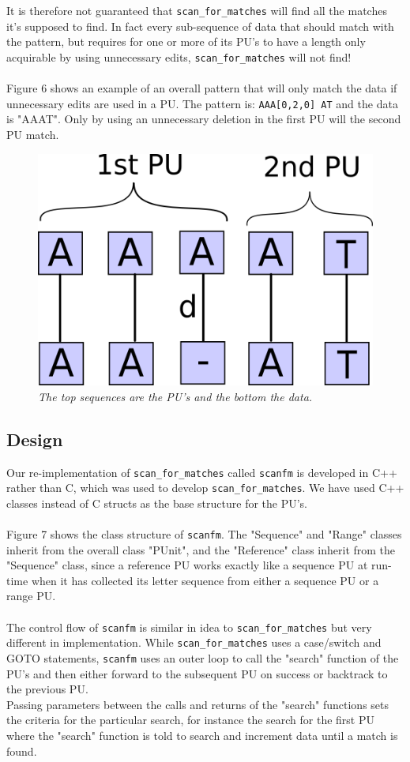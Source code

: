 \documentclass[12pt]{article}
\newcommand{\scm}{\texttt{scan\_for\_matches} }
\newcommand{\sfm}{\texttt{scanfm} }
\newcommand{\pu}{PU }
\newcommand{\pus}{PU's }
\newcommand{\pup}{PU. }
\begin{document}
It is therefore not guaranteed that \scm will find all the matches it's supposed to find. In fact every sub-sequence
of data that should match with the pattern, but requires for one or more of its \pus to have a length only
acquirable by using unnecessary edits, \scm will not find! \\ \\
Figure 6 shows an example of an overall pattern that will only match the data if unnecessary edits are used in a \pup
The pattern is: \texttt{AAA[0,2,0] AT} and the data is "AAAT". Only by using an unnecessary deletion in the first
\pu will the second \pu match.
\begin{figure}[H]
\begin{center}
\includegraphics[scale=0.3]{Diagrams/scnfail.png}
\end{center}
\caption{\textit{The top sequences are the \pus and the bottom the data.}}
\end{figure}
\subsection{Design}
Our re-implementation of \scm called \sfm is developed in C++ rather than C, which was used to develop 
\texttt{scan\_for\_matches}. We have used C++ classes instead of C structs as the base structure for the PU's. \\ \\ 
Figure 7 shows the class structure of \texttt{scanfm}. The "Sequence" and "Range" classes inherit from the overall
class "PUnit", and the "Reference" class inherit from the "Sequence" class, since a reference \pu works exactly like a 
sequence \pu at run-time when it has collected its letter sequence from either a sequence \pu or a range \pup \\ \\
The control flow of \sfm is similar in idea to \scm but very different in implementation. While \scm uses a case/switch
and GOTO statements, \sfm uses an outer loop to call the "search" function of the \pus and then either
forward to the subsequent \pu on success or backtrack to the previous \pup \\
Passing parameters between the calls and returns of the "search" functions sets the criteria for the particular search, for
instance the search for the first \pu where the "search" function is told to search and increment data until a match is \\
found.
\end{document}
